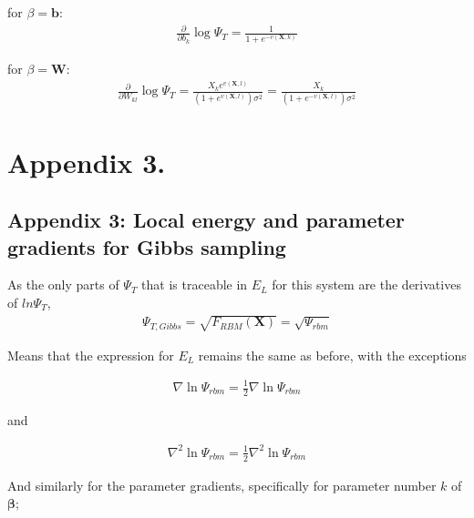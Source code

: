 \documentclass[%
oneside,                 %
final,                   %
10pt]{article}
\begin{document}
\begin{appendices}
for $\beta=\bm b$:
\begin{equation}
\begin{aligned}
\frac{\partial}{\partial b_k} \log \Psi_T 
= 
  \frac{1}{1 + e^{-v(\bm X,k)}}
\end{aligned}
\end{equation}

for $\beta=\bm W$:
\begin{equation}
\begin{aligned}
\frac{\partial}{\partial W_{kl}} \log \Psi_T = 
  \frac{X_k e^{v(\bm X,l)} }{(1 + e^{v(\bm X,l)}) \sigma^2} =
  \frac{X_k} {(1 + e^{-v(\bm X,l)}) \sigma^2} 
\end{aligned}
\end{equation}


\section{Appendix 3.} \label{APP_3}
\subsection{Appendix 3: Local energy and parameter gradients for Gibbs sampling}
As the only parts of $\Psi_T$ that is traceable in $E_L$ for this system are the derivatives of $ln \Psi_T$, 
\begin{equation}
\begin{aligned}
\Psi_{T,Gibbs}=\sqrt{F_{RBM}(\bm X)}=\sqrt{\Psi_{rbm} }
\end{aligned}
\label{eq:wfgibs}
\end{equation}

Means that the expression for $E_L$ remains the same as before, with the exceptions

\begin{equation}
\begin{aligned}
\nabla \ln \Psi_{rbm} = \frac{1}{2} \nabla \ln \Psi_{rbm}
\end{aligned}
\end{equation}

and

\begin{equation}
\begin{aligned}
\nabla^2 \ln \Psi_{rbm} = \frac{1}{2} \nabla^2 \ln \Psi_{rbm}
\end{aligned}
\end{equation}

And similarly for the parameter gradients, specifically for parameter number $k$ of $\bm \beta$;


\end{appendices}
\end{document}
